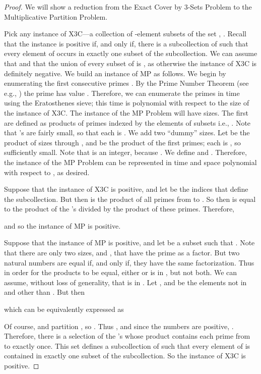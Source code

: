 \documentclass[letterpaper,11pt]{article}
\begin{document}
\begin{proof}
We will show a reduction from the Exact Cover by 3-Sets Problem to the Multiplicative Partition Problem.

Pick any instance of X3C---a collection  of -element subsets of the set , . Recall that the instance is positive if, and only if, there is a subcollection of  such that every element of  occurs in exactly one subset of the subcollection. We can assume that  and that the union of every subset of  is , as otherwise the instance of X3C is definitely negative.
We build an instance of MP as follows. We begin by enumerating the first consecutive primes . By the Prime Number Theorem (see e.g., \cite{IR90}) the prime  has value . Therefore, we can enumerate the primes in time  using the Eratosthenes sieve; this time is polynomial with respect to the size of the instance of X3C. 
The instance of the MP Problem will have  sizes. The first  are defined as products of primes indexed by the elements of subsets i.e., . Note that 's are fairly small, so that each  is . 
We add two ``dummy'' sizes. Let  be the product of sizes  through , and  be the product of the first  primes; each is , so sufficiently small. Note that  is an integer, because . We define  and . Therefore, the instance of the MP Problem can be represented in time and space polynomial with respect to , as desired.

Suppose that the instance of X3C is positive, and let  be the indices that define the subcollection. But then  is the product of all primes from  to . So then  is equal to the product of the 's divided by the product of these primes. Therefore,

and so the instance of MP is positive.


Suppose that the instance of MP is positive, and let  be a subset such that . Note that there are only two sizes,  and , that have the prime  as a factor. But two natural numbers are equal if, and only if, they have the same factorization. Thus in order for the products to be equal, either  or  is in , but not both. We can assume, without loss of generality, that  is in .
Let , and  be the elements not in  and other than . But then 

which can be equivalently expressed as

Of course,  and  partition , so . Thus
, and since the numbers are positive, . Therefore, there is a selection of the 's whose product contains each prime from  to  exactly once. This set  defines a subcollection of  such that every element of  is contained in exactly one subset of the subcollection. So the instance of X3C is positive.
\end{proof}
\end{document}
